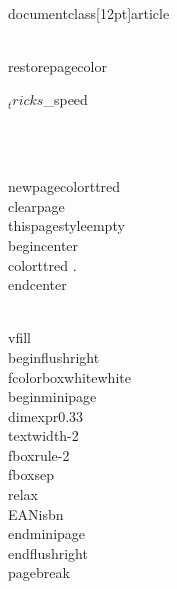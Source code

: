 \\documentclass[12pt]{article}
\begin{document}
  \\restorepagecolor

  ${_tricks}

  ${_speed}

  \

  \\newpagecolor{ttred}
  \\clearpage
  \\thispagestyle{empty}
  \\begin{center}
    \\color{ttred}
    .
  \\end{center}

  \\vfill
  \\begin{flushright}
    \\fcolorbox{white}{white}{%
    \\begin{minipage}{\\dimexpr0.33\\textwidth-2\\fboxrule-2\\fboxsep\\relax}
      \\EANisbn
    \\end{minipage}}
  \\end{flushright}
  \\pagebreak
\
\end{document}
